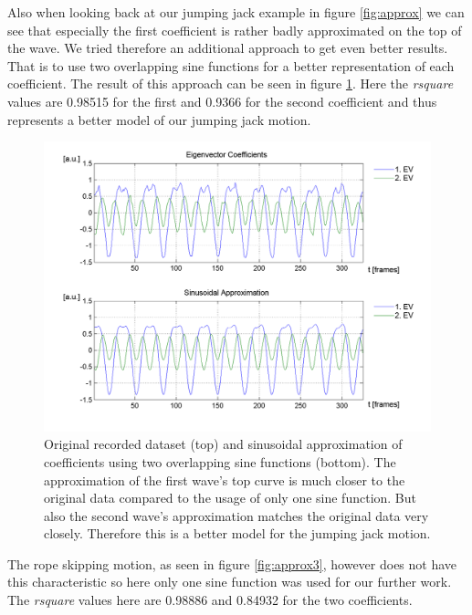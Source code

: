 \documentclass[a4paper]{article}
\begin{document}
Also when looking back at our jumping jack example in figure \ref{fig:approx} we can see that especially the first coefficient is rather badly approximated on the top of the wave.
We tried therefore an additional approach to get even better results. That is to use two overlapping sine functions for a better representation of each coefficient.
The result of this approach can be seen in figure \ref{fig:approx2}.
Here the \emph{rsquare} values are 0.98515 for the first and 0.9366 for the second coefficient and thus represents a better model of our jumping jack motion.

\begin{figure}
		\centering
		\includegraphics[width=\textwidth]{2sinHamp.png}
		\caption{Original recorded dataset (top) and sinusoidal approximation of coefficients using two overlapping sine functions (bottom).
		The approximation of the first wave's top curve is much closer to the original data compared to the usage of only one sine function.
		But also the second wave's approximation matches the original data very closely.
		Therefore this is a better model for the jumping jack motion.}
		\label{fig:approx2}
\end{figure}

The rope skipping motion, as seen in figure \ref{fig:approx3}, however does not have this characteristic so here only one sine function was used for our further work.
The \emph{rsquare} values here are 0.98886 and 0.84932 for the two coefficients.
\end{document}

